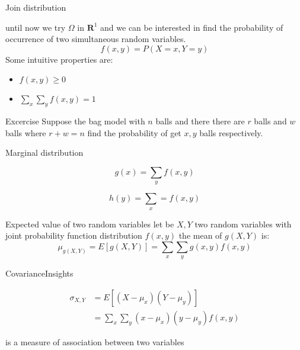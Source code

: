 \documentclass{beamer}
\begin{document}
\begin{frame}{Join distribution}

until now we try $\Omega$ in $\textbf{R}^{1}$ and we can be interested in find the probability of occurrence of two simultaneous random variables.
\begin{equation}
f(x,y) = P(X=x, Y=y)
\end{equation}
Some intuitive properties are:
\begin{itemize}
\item $f(x,y) \geq 0$
\item $\sum_{x}\sum_{y} f(x,y) =  1$ 
\end{itemize}

\begin{block}{Excercise}
Suppose the bag model with $n$ balls and there there are $r$ balls and $w$ balls where $r+w=n$ find the probability of get $x,y$ balls respectively.
\end{block}

\end{frame}

\begin{frame}{Marginal distribution}

\begin{equation}
g(x) = \sum_{y} f(x,y)
\end{equation}



\begin{equation}
h(y) = \sum_{x} = f(x,y)
\end{equation}
\end{frame}


\begin{frame}{Expected value of two random variables}
let be $X,Y$ two random variables with joint probability function distribution $f(x,y)$ the mean of $g(X,Y)$ is:
\begin{equation}
\mu_{g(X,Y)} = E[g(X,Y)] = \sum_{x} \sum_{y} g(x,y)f(x,y)
\end{equation}

\end{frame}



\begin{frame}{Covariance}{Insights}



\begin{equation}
\begin{align*}
\sigma_{X,Y} &= E[(X - \mu_{x})(Y - \mu_{y})] \\
 &= \sum_{x} \sum_{y} ( x  - \mu_{x}) (y - \mu_{y})f(x,y)
\end{align*}
\end{equation}

is a measure of association between two variables

\end{frame}
\end{document}
